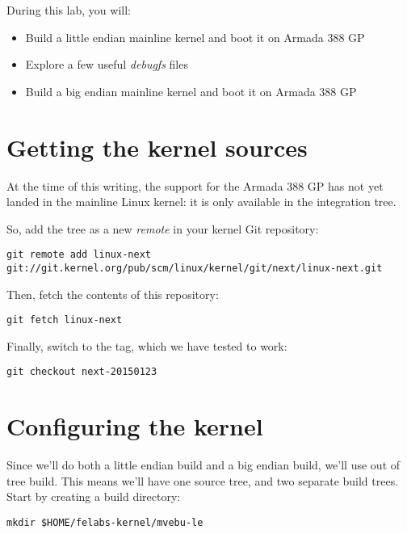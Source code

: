 
During this lab, you will:

\begin{itemize}
\item Build a little endian mainline kernel and boot it on Armada 388 GP
\item Explore a few useful {\em debugfs} files
\item Build a big endian mainline kernel and boot it on Armada 388 GP
\end{itemize}

\section{Getting the kernel sources}

At the time of this writing, the support for the Armada 388 GP has not
yet landed in the mainline Linux kernel: it is only available in the
 integration tree.

So, add the  tree as a new {\em remote} in your
kernel Git repository:

\begin{verbatim}
git remote add linux-next git://git.kernel.org/pub/scm/linux/kernel/git/next/linux-next.git
\end{verbatim}

Then, fetch the contents of this repository:

\begin{verbatim}
git fetch linux-next
\end{verbatim}

Finally, switch to the  tag, which we have tested
to work:

\begin{verbatim}
git checkout next-20150123
\end{verbatim}

\section{Configuring the kernel}

Since we'll do both a little endian build and a big endian build,
we'll use out of tree build. This means we'll have one source tree,
and two separate build trees. Start by creating a build directory:

\begin{verbatim}
mkdir $HOME/felabs-kernel/mvebu-le
\end{verbatim}

